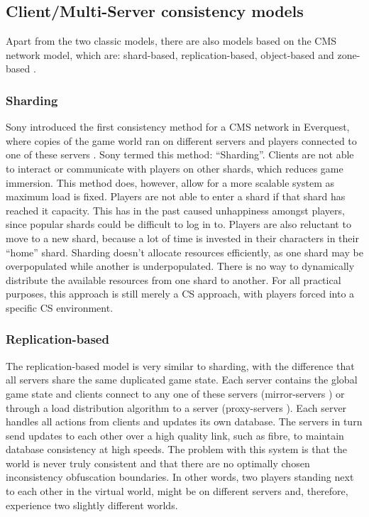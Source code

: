 \documentclass[journal,oneside,a4paper,onecolumn]{IEEEtran}
\begin{document}
\subsection{Client/Multi-Server consistency models}
\label{cms_models}


Apart from the two classic models, there are also models based on the \ac{CMS} network model, which are: shard-based, replication-based, object-based and zone-based \cite{Hu_voronoi_IM}.

\subsubsection{Sharding}
Sony introduced the first consistency method for a \ac{CMS} network in Everquest, where copies of the game world ran on different servers and players connected to one of these servers \cite{engineering_everquest}. Sony termed this method: ``Sharding''. Clients are not able to interact or communicate with players on other shards, which reduces game immersion. This method does, however, allow for a more scalable system as maximum load is fixed. Players are not able to enter a shard if that shard has reached it capacity. This has in the past caused unhappiness amongst players, since popular shards could be difficult to log in to. Players are also reluctant to move to a new shard, because a lot of time is invested in their characters in their ``home'' shard. Sharding doesn't allocate resources efficiently, as one shard may be overpopulated while another is underpopulated. There is no way to dynamically distribute the available resources from one shard to another. For all practical purposes, this approach is still merely a \ac{CS} approach, with players forced into a specific \ac{CS} environment.

\subsubsection{Replication-based}
The replication-based model is very similar to sharding, with the difference that all servers share the same duplicated game state. Each server contains the global game state and clients connect to any one of these servers (mirror-servers \cite{mirrored_server}) or through a load distribution algorithm to a server (proxy-servers \cite{proxy_server_dist}). Each server handles all actions from clients and updates its own database. The servers in turn send updates to each other over a high quality link, such as fibre, to maintain database consistency at high speeds. The problem with this system is that the world is never truly consistent and that there are no optimally chosen inconsistency obfuscation boundaries. In other words, two players standing next to each other in the virtual world, might be on different servers and, therefore, experience two slightly different worlds.
\end{document}
